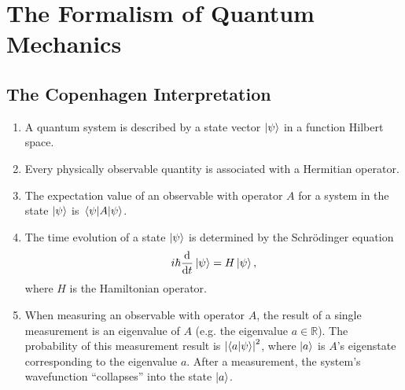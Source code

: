 \documentclass[11pt, a4paper]{article}
\newcommand{\Schro}{Schr\"{o}dinger\xspace}
\begin{document}
\newpage
\section{The Formalism of Quantum Mechanics}
\subsection{The Copenhagen Interpretation}
\begin{enumerate}
	\item A quantum system is described by a state vector $ \ket{\psi} $ in a function Hilbert space.
	
	\item Every physically observable quantity is associated with a Hermitian operator.
	
	\item The expectation value of an observable with operator $ A $ for a system in the state $ \ket{\psi} $ is $ \mel{\psi}{A}{\psi} $.
	
	\item The time evolution of a state $ \ket{\psi} $ is determined by the \Schro equation
	\begin{equation*}
		i \hbar \dv{t} \ket{\psi} = H \ket{\psi},
	\end{equation*}
	where $ H $ is the Hamiltonian operator.
	
	\item When measuring an observable with operator $ A $, the result of a single measurement is an eigenvalue of $ A $ (e.g. the eigenvalue $ a \in \mathbb{R} $). The probability of this measurement result is $ \abs{\braket{a}{\psi}}^{2} $, where $ \ket{a} $ is $ A $'s eigenstate corresponding to the eigenvalue $ a $. After a measurement, the system's wavefunction ``collapses'' into the state $ \ket{a} $.
\end{enumerate}
\end{document}
